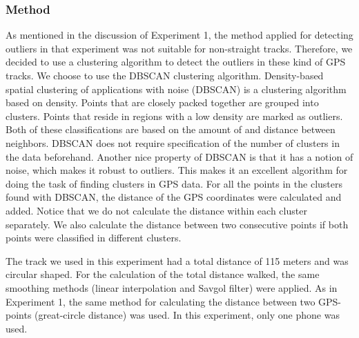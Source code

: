 \subsubsection{Method}
As mentioned in the discussion of Experiment 1, the method applied for detecting outliers in that experiment was not suitable for non-straight tracks. 
Therefore, we decided to use a clustering algorithm to detect the outliers in these kind of GPS tracks.
We choose to use the DBSCAN clustering algorithm.
Density-based spatial clustering of applications with noise (DBSCAN) is a clustering algorithm based on density.
Points that are closely packed together are grouped into clusters.
Points that reside in regions with a low density are marked as outliers.
Both of these classifications are based on the amount of and distance between neighbors.
DBSCAN does not require specification of the number of clusters in the data beforehand.
Another nice property of DBSCAN is that it has a notion of noise, which makes it robust to outliers.
This makes it an excellent algorithm for doing the task of finding clusters in GPS data.
For all the points in the clusters found with DBSCAN, the distance of the GPS coordinates were calculated and added.
Notice that we do not calculate the distance within each cluster separately.
We also calculate the distance between two consecutive points if both points were classified in different clusters.

The track we used in this experiment had a total distance of 115 meters and was circular shaped.
For the calculation of the total distance walked, the same smoothing methods (linear interpolation and Savgol filter) were applied.
As in Experiment 1, the same method for calculating the distance between two GPS-points (great-circle distance) was used.
In this experiment, only one phone was used. 

